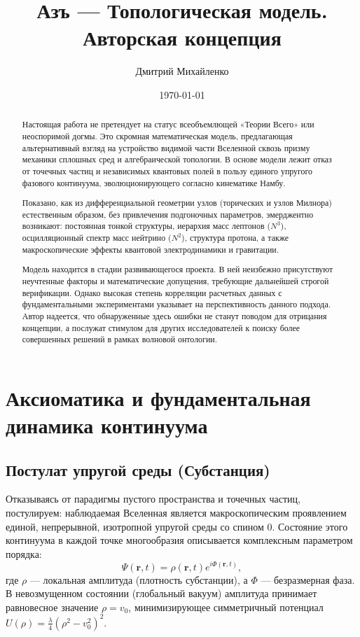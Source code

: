 \documentclass[12pt,a4paper]{article}
\title{Азъ — Топологическая модель. Авторская концепция}
\author{Дмитрий Михайленко}
\date{\today}
\begin{document}
	
\maketitle

\begin{abstract}
	Настоящая работа не претендует на статус всеобъемлющей «Теории Всего» или неоспоримой догмы. Это скромная математическая модель, предлагающая альтернативный взгляд на устройство видимой части Вселенной сквозь призму механики сплошных сред и алгебраической топологии. В основе модели лежит отказ от точечных частиц и независимых квантовых полей в пользу единого упругого фазового континуума, эволюционирующего согласно кинематике Намбу. 
	
	Показано, как из дифференциальной геометрии узлов (торических и узлов Милнора) естественным образом, без привлечения подгоночных параметров, эмерджентно возникают: постоянная тонкой структуры, иерархия масс лептонов ($N^3$), осцилляционный спектр масс нейтрино ($N^2$), структура протона, а также макроскопические эффекты квантовой электродинамики и гравитации.
	
	Модель находится в стадии развивающегося проекта. В ней неизбежно присутствуют неучтенные факторы и математические допущения, требующие дальнейшей строгой верификации. Однако высокая степень корреляции расчетных данных с фундаментальными экспериментами указывает на перспективность данного подхода. Автор надеется, что обнаруженные здесь ошибки не станут поводом для отрицания концепции, а послужат стимулом для других исследователей к поиску более совершенных решений в рамках волновой онтологии.
\end{abstract}

	\section{Аксиоматика и фундаментальная динамика континуума}

	\subsection{Постулат упругой среды (Субстанция)}
Отказываясь от парадигмы пустого пространства и точечных частиц, постулируем: наблюдаемая Вселенная является макроскопическим проявлением единой, непрерывной, изотропной упругой среды со спином 0. Состояние этого континуума в каждой точке многообразия описывается комплексным параметром порядка:
	\begin{equation}
	\Psi(\mathbf{r}, t) = \rho(\mathbf{r}, t) e^{i\Phi(\mathbf{r}, t)},
	\end{equation}
где $\rho$ — локальная амплитуда (плотность субстанции), а $\Phi$ — безразмерная фаза. В невозмущенном состоянии (глобальный вакуум) амплитуда принимает равновесное значение $\rho = v_0$, минимизирующее симметричный потенциал $U(\rho) = \frac{\lambda}{4}(\rho^2 - v_0^2)^2$.
\end{document}
